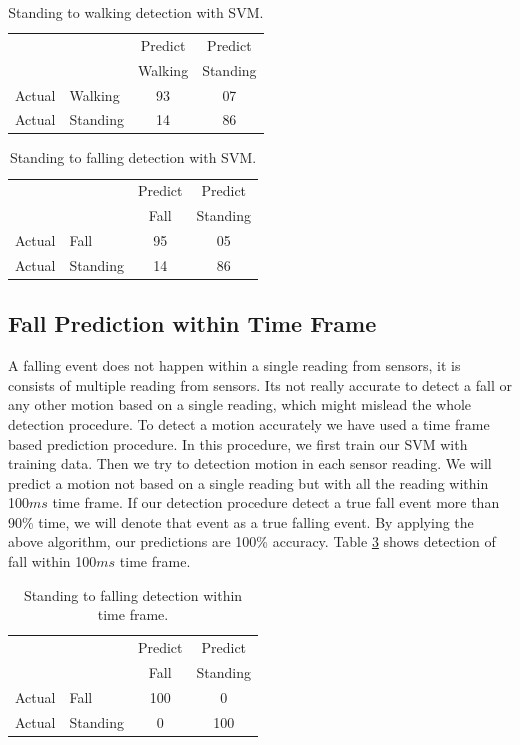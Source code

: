 \documentclass[letterpaper]{article}
\begin{document}
\begin{table}[!ht]
	\caption{Standing to walking detection with SVM.}
	\label{tab:StandingToWalkingDetectionsvm}
	\centering
		\begin{tabular} {l l |c |c}
			& & Predict& Predict \\ 
			& & Walking & Standing \\ \hline
			Actual& Walking & 93 & 07\\ \hline
			Actual& Standing & 14& 86\\ \hline
		\end{tabular}
\end{table}

\begin{table}[!ht]
	\caption{Standing to falling detection with SVM.}
	\label{tab:StandingToFallingDetectionsvm}
	\centering
		\begin{tabular} {l l |c |c}
			& & Predict& Predict \\ 
			& & Fall & Standing \\ \hline
			Actual& Fall & 95 & 05\\ \hline
			Actual& Standing & 14& 86\\ \hline
		\end{tabular}
\end{table}

\subsection*{Fall Prediction within Time Frame}

A falling event does not happen within a single reading from sensors, it is consists of multiple
reading from sensors.  Its not really accurate to detect a fall or any other motion based on a
single reading, which might mislead the whole detection procedure. To detect a motion accurately we
have used a time frame based prediction procedure. In this procedure, we first train our SVM with
training data. Then we try to detection motion in each sensor reading. We will predict a motion not
based on a single reading but with all the reading within 100$ms$ time frame. If our detection
procedure detect a true fall event more than 90\% time, we will denote that event as a true
falling event. By applying the above algorithm, our predictions are 100\% accuracy.
Table \ref{tab:StandingToFallingDetectionsvmframe} shows detection of fall within 100$ms$ time
frame.

\begin{table}[!ht]
\caption{Standing to falling detection within time frame.}
	\label{tab:StandingToFallingDetectionsvmframe}
	\centering
		\begin{tabular} {l l |c |c}
			& & Predict& Predict \\ 
			& & Fall & Standing \\ \hline
			Actual& Fall & 100 & 0\\ \hline
			Actual& Standing & 0& 100\\ \hline
		\end{tabular}
\end{table}
\end{document}
